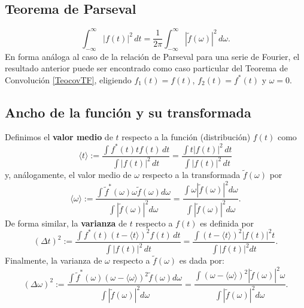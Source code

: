\subsection{Teorema de Parseval}
\begin{equation}
\boxed{
\int_{-\infty}^\infty |f(t)|^2\,dt=\frac{1}{2\pi}\int_{-\infty}^\infty |\tilde{f}(\omega)|^2\,d\omega.
 }
\end{equation}
En forma análoga al caso de la relación de Parseval para una serie de Fourier, el resultado anterior puede ser encontrado como caso particular del Teorema de Convolución \eqref{TeocovTF}, eligiendo $f_1(t)=f(t)$, $f_2(t)=f^\ast(t)$ y $\omega=0$.
\subsection{Ancho de la función y su transformada}

Definimos el \textbf{valor medio} de $t$ respecto a la función (distribución) $f(t)$ como
\begin{equation}
\langle t \rangle:=\frac{\int f^{*}(t) t f(t)\,dt}{\int |f(t)|^{2}\, dt}=\frac{\int t |f(t)|^2\,dt}{\int |f(t)|^2\,dt}
\end{equation}
y, análogamente, el valor medio de $\omega$ respecto a la transformada $\tilde{f}(\omega)$ por
\begin{equation}
\langle \omega \rangle:=\frac{\int \tilde{f}^{*}(\omega) \omega \tilde{f}(\omega) d\omega}{\int |\tilde{f}(\omega)|^{2} d\omega}=\frac{\int \omega |\tilde{f}(\omega)|^2 d\omega}{\int |\tilde{f}(\omega)|^2 d\omega}.
\end{equation}
De forma similar, la \textbf{varianza} de $t$ respecto a $f(t)$ es definida por
\begin{equation}
(\Delta t)^2:=\frac{\int f^{*}(t)(t-\langle t \rangle)^2 f(t)\,dt}{\int |f(t)|^2\, dt}=\frac{\int (t- \langle t \rangle)^2 |f(t)|^2 t}{\int |f(t)|^2 dt}.
\end{equation}
Finalmente, la varianza de $\omega$ respecto a $\tilde{f}(\omega)$ es dada por:
\begin{equation}
(\Delta \omega)^2:=\frac{\int \tilde{f}^{*}(\omega)(\omega-\langle \omega \rangle)^2 \tilde{f}( \omega) d\omega}{\int |\tilde{f}(\omega)|^2 d\omega}=\frac{\int (\omega- \langle \omega \rangle)^2 |\tilde{f}(\omega)|^2 \omega}{\int |\tilde{f}(\omega)|^2 d\omega}.
\end{equation}


